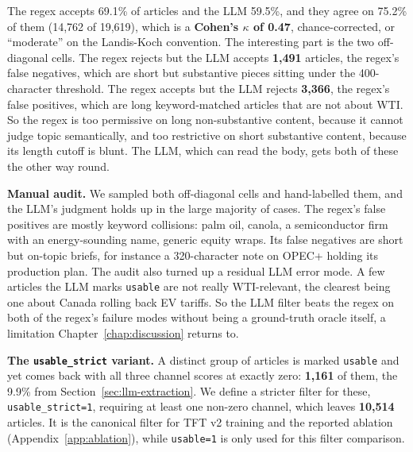 The regex accepts 69.1\% of articles and the LLM 59.5\%, and they agree on 75.2\% of them (14{,}762 of 19{,}619), which is a \textbf{Cohen's $\kappa$ of 0.47}, chance-corrected, or ``moderate'' on the Landis-Koch convention. The interesting part is the two off-diagonal cells. The regex rejects but the LLM accepts \textbf{1{,}491} articles, the regex's false negatives, which are short but substantive pieces sitting under the 400-character threshold. The regex accepts but the LLM rejects \textbf{3{,}366}, the regex's false positives, which are long keyword-matched articles that are not about WTI. So the regex is too permissive on long non-substantive content, because it cannot judge topic semantically, and too restrictive on short substantive content, because its length cutoff is blunt. The LLM, which can read the body, gets both of these the other way round.

\textbf{Manual audit.} We sampled both off-diagonal cells and hand-labelled them, and the LLM's judgment holds up in the large majority of cases. The regex's false positives are mostly keyword collisions: palm oil, canola, a semiconductor firm with an energy-sounding name, generic equity wraps. Its false negatives are short but on-topic briefs, for instance a 320-character note on OPEC+ holding its production plan. The audit also turned up a residual LLM error mode. A few articles the LLM marks \texttt{usable} are not really WTI-relevant, the clearest being one about Canada rolling back EV tariffs. So the LLM filter beats the regex on both of the regex's failure modes without being a ground-truth oracle itself, a limitation Chapter~\ref{chap:discussion} returns to.

\textbf{The \texttt{usable\_strict} variant.} A distinct group of articles is marked \texttt{usable} and yet comes back with all three channel scores at exactly zero: \textbf{1{,}161} of them, the 9.9\% from Section~\ref{sec:llm-extraction}. We define a stricter filter for these, \texttt{usable\_strict=1}, requiring at least one non-zero channel, which leaves \textbf{10{,}514} articles. It is the canonical filter for TFT v2 training and the reported ablation (Appendix~\ref{app:ablation}), while \texttt{usable=1} is only used for this filter comparison.

